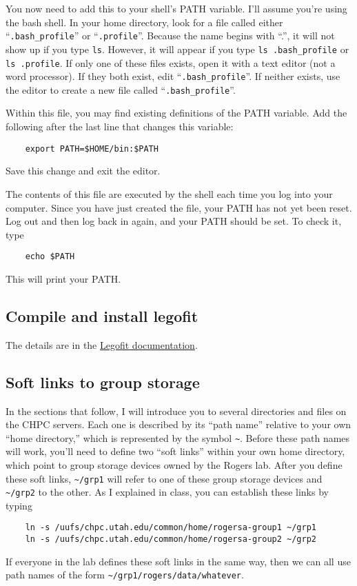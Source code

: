 \documentclass[11pt]{article}
\begin{document}
You now need to add this to your shell's PATH variable. I'll assume
you're using the bash shell. In your home directory, look for a file
called either ``\verb|.bash_profile|'' or
``\texttt{.profile}''. Because the name begins with ``.'', it will not
show up if you type \texttt{ls}. However, it will appear if you type
\verb|ls .bash_profile| or \verb|ls .profile|. If only one of these
files exists, open it with a text editor (not a word processor). If
they both exist, edit ``\verb|.bash_profile|''. If neither exists, use
the editor to create a new file called ``\verb|.bash_profile|''.

Within this file, you may find existing definitions of the PATH
variable. Add the following after the last line that changes this
variable:
\begin{verbatim}
    export PATH=$HOME/bin:$PATH
\end{verbatim}
Save this change and exit the editor.

The contents of this file are executed by the shell each time you log
into your computer. Since you have just created the file, your PATH
has not yet been reset. Log out and then log back in again, and your
PATH should be set. To check it, type
\begin{verbatim}
    echo $PATH
\end{verbatim}
This will print your PATH.

\subsection{Compile and install legofit}
The details are in the
\href{http://alanrogers.github.io/legofit/html/index.html}{Legofit
  documentation}. 

\subsection{Soft links to group storage}
In the sections that follow, I will introduce you to several
directories and files on the CHPC servers. Each one is described by
its ``path name'' relative to your own ``home directory,'' which is
represented by the symbol \verb|~|. Before these path names will work,
you'll need to define two ``soft links'' within your own home directory,
which point to group storage devices owned by the Rogers lab. After
you define these soft links, \verb|~/grp1| will refer to one of these
group storage devices and \verb|~/grp2| to the other. As I explained in
class, you can establish these links by typing
\begin{verbatim}
    ln -s /uufs/chpc.utah.edu/common/home/rogersa-group1 ~/grp1
    ln -s /uufs/chpc.utah.edu/common/home/rogersa-group2 ~/grp2
\end{verbatim}
If everyone in the lab defines these soft links in the same way, then
we can all use path names of the form
\verb|~/grp1/rogers/data/whatever|.
\end{document}
